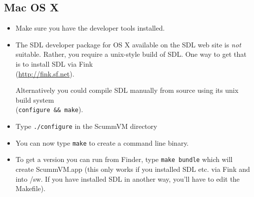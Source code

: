 \subsection{Mac OS X}
\begin{itemize}
\item Make sure you have the developer tools installed.
\item The SDL developer package for OS X available on the SDL web site is
      \textit{not} suitable. Rather, you require a unix-style build of SDL. One
      way to get that is to install SDL via Fink\\
      (\url{http://fink.sf.net}).
      
      Alternatively you could compile SDL manually from source using its
      unix build system\\
      (\texttt{configure \&\& make}).
\item Type \texttt{./configure} in the ScummVM directory
\item You can now type \texttt{make} to create a command line binary.
\item To get a version you can run from Finder, type \texttt{make bundle} which
      will create ScummVM.app (this only works if you installed SDL
      etc. via Fink and into /sw. If you have installed SDL in another
      way, you'll have to edit the Makefile).
\end{itemize}
